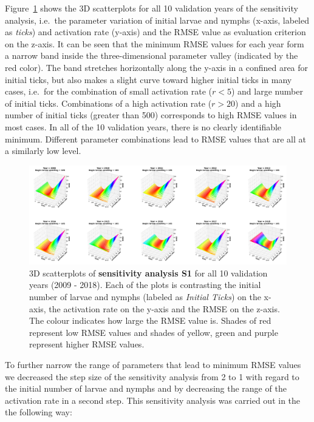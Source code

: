 \documentclass[a4paper, 11pt]{scrartcl}
\begin{document}
Figure~\ref{fig:initial_ticks_with_beech_error_v1} shows the 3D scatterplots for all 10 validation years of the sensitivity analysis, i.e.\ the parameter variation of initial
larvae and nymphs (x-axis, labeled as \textit{ticks}) and activation rate (y-axis) and the RMSE value as evaluation criterion on the z-axis. It can be seen that the minimum RMSE
values for each year form a narrow band inside the three-dimensional parameter valley (indicated by the red color). The band stretches horizontally along the y-axis in a
confined area for initial ticks, but also makes a slight curve toward higher initial ticks in many cases, i.e.\ for the combination of small activation rate ($r < 5$) and large
number of initial ticks. Combinations of a high activation rate ($r > 20$) and a high number of initial ticks (greater than 500) corresponds to high RMSE values in
most cases. In all of the 10 validation years, there is no clearly identifiable minimum. Different parameter combinations lead to RMSE values that are all at a similarly low
level.

\begin{figure}[h!]
\centering
\includegraphics[width=\linewidth]{figures/initial_ticks_with_beech_error_v1}
\caption{3D scatterplots of \textbf{sensitivity analysis S1} for all 10 validation years (2009 - 2018). Each of the plots is contrasting the initial number of larvae and nymphs
(labeled as \textit{Initial Ticks}) on the x-axis, the activation rate on the y-axis and the RMSE on the z-axis. The colour indicates how large the RMSE value is. Shades of
red represent low RMSE values and shades of yellow, green and purple represent higher RMSE values.}
\label{fig:initial_ticks_with_beech_error_v1}
\end{figure}

To further narrow the range of parameters that lead to minimum RMSE values we decreased the step size of the sensitivity analysis from 2 to 1 with regard to the initial number of
larvae and nymphs and by decreasing the range of the activation rate in a second step. This sensitivity analysis was carried out in the the following way:
\end{document}
